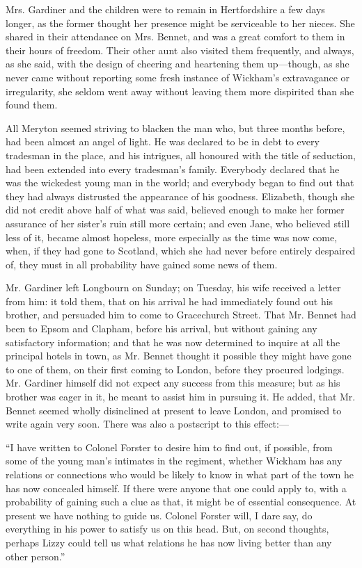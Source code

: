 \documentclass[10pt]{book}
\begin{document}
   Mrs. Gardiner and the children were to remain in Hertfordshire a few
days longer, as the former thought her presence might be serviceable to
her nieces. She shared in their attendance on Mrs. Bennet, and was a
great comfort to them in their hours of freedom. Their other aunt also
visited them frequently, and always, as she said, with the design of
cheering and heartening them up—though, as she never came without
reporting some fresh instance of Wickham’s extravagance or irregularity,
she seldom went away without leaving them more dispirited than she found
them.
  

   All Meryton seemed striving to blacken the man who, but three months
before, had been almost an angel of light. He was declared to be in debt
to every tradesman in the place, and his intrigues, all honoured with
the title of seduction, had been extended into every tradesman’s family.
Everybody declared that he was the wickedest young man in the world; and
everybody began to find out that they had always distrusted the
appearance of his goodness. Elizabeth, though she did not credit above
half of what was said, believed enough to make her former assurance of
her sister’s ruin still more certain; and even Jane, who believed still
less of it, became almost hopeless, more especially as the time was now
come, when, if they had gone to Scotland, which she had never before
entirely despaired of, they must in all probability have gained some
news of them.
  

   Mr. Gardiner left Longbourn on Sunday; on Tuesday, his wife received a
letter from him: it told them, that on his arrival he had immediately
found out his brother, and persuaded him to come to Gracechurch Street.
That Mr. Bennet had been to Epsom and Clapham, before his arrival, but
without gaining any satisfactory information; and that he was now
determined to inquire at all the principal hotels in town, as Mr. Bennet
thought it possible they might have gone to one of them, on their first
coming to London, before they procured lodgings. Mr. Gardiner himself
did not expect any success from this measure; but as his brother was
eager in it, he meant to assist him in pursuing it. He added, that Mr.
Bennet seemed wholly disinclined at present to leave London, and
promised to write again very soon. There was also a postscript to this
effect:—
  

   “I have written to Colonel Forster to desire him to find out, if
possible, from some of the young man’s intimates in the regiment,
whether Wickham has any relations or connections who would be likely to
know in what part of the town he has now concealed himself. If there
were anyone that one could apply to, with a probability of gaining such
a clue as that, it might be of essential consequence. At present we have
nothing to guide us. Colonel Forster will, I dare say, do everything in
his power to satisfy us on this head. But, on second thoughts, perhaps
Lizzy could tell us what relations he has now living better than any
other person.”
  
\end{document}

